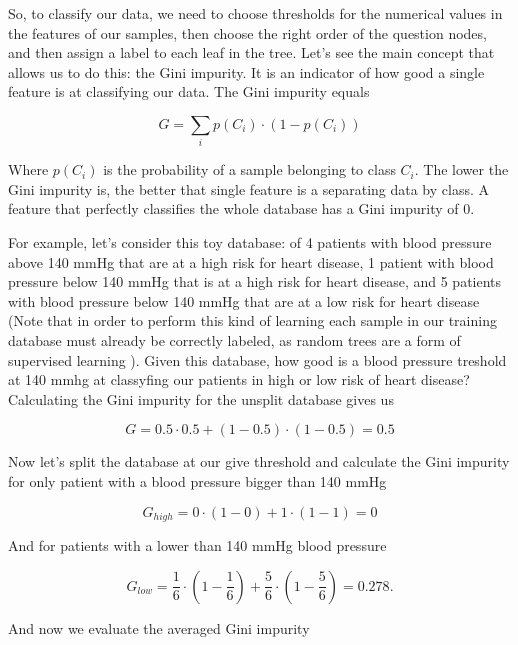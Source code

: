 \documentclass[a4paper]{report}
\begin{document}
So, to classify our data, we need to choose thresholds for the numerical values in the features of our samples, then choose the right order of the question nodes, and then assign a label to each leaf in the tree. Let's see the main concept that allows us to do this: the Gini impurity. It is an indicator of how good a single feature is at classifying our data. The Gini impurity equals

\begin{equation}
    G = \sum_i p(C_i) \cdot (1 - p(C_i))
\end{equation}

Where $p(C_i)$ is the probability of a sample belonging to class $C_i$. The lower the Gini impurity is, the better that single feature is a separating data by class. A feature that perfectly classifies the whole database has a Gini impurity of 0.

For example, let's consider this toy database:
of 4 patients with blood pressure above 140 mmHg that are at a high risk for heart disease, 1 patient with blood pressure below 140 mmHg that is at a high risk for heart disease, and 5 patients with blood pressure below 140 mmHg that are at a low risk for heart disease (Note that in order to perform this kind of learning each sample in our training database must already be correctly labeled, as random trees are a form of supervised learning ). Given this database, how good is a blood pressure treshold at 140 mmhg at classyfing our patients in high or low risk of heart disease? Calculating the Gini impurity for the unsplit database gives us

\begin{equation}
    G = 0.5 \cdot 0.5 + (1-0.5) \cdot (1-0.5) = 0.5
\end{equation}

Now let's split the database at our give threshold and calculate the Gini impurity for only patient with a blood pressure bigger than 140 mmHg

\begin{equation}
    G_{high} = 0 \cdot (1 -0) + 1 \cdot (1-1) = 0
\end{equation}

And for patients with a lower than 140 mmHg blood pressure

\begin{equation}
    G_{low} = \frac{1}{6} \cdot (1 - \frac{1}{6}) + \frac{5}{6} \cdot (1- \frac{5}{6}) = 0.278.
\end{equation}

And now we evaluate the averaged Gini impurity
\end{document}
